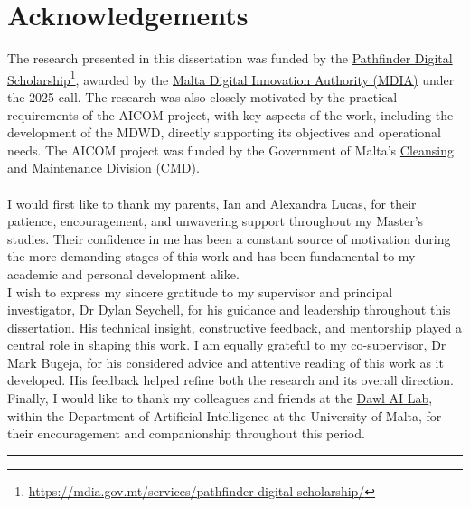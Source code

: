 \chapter*{Acknowledgements}

The research presented in this dissertation was funded by the \href{https://mdia.gov.mt/services/pathfinder-digital-scholarship/}
{Pathfinder Digital Scholarship}\footnote{\url{https://mdia.gov.mt/services/pathfinder-digital-scholarship/}}, awarded by the \href{https://mdia.gov.mt/}{Malta Digital Innovation Authority (MDIA)} under the 2025 call. The research was also closely motivated by the practical requirements of the \gls{AICOM} project, with key aspects of the work, including the development of the \gls{MDWD}, directly supporting its objectives and operational needs. The \gls{AICOM} project was funded by the Government of Malta's \href{https://publiccleanliness.gov.mt/public-bodies/cmd/}{Cleansing and Maintenance Division (CMD)}.\\\\

\noindent I would first like to thank my parents, Ian and Alexandra Lucas, for their patience, encouragement, and unwavering support throughout my Master's studies. Their confidence in me has been a constant source of motivation during the more demanding stages of this work and has been fundamental to my academic and personal development alike.\\

\noindent I wish to express my sincere gratitude to my supervisor and principal investigator, Dr Dylan Seychell, for his guidance and leadership throughout this dissertation. His technical insight, constructive feedback, and mentorship played a central role in shaping this work. I am equally grateful to my co-supervisor, Dr Mark Bugeja, for his considered advice and attentive reading of this work as it developed. His feedback helped refine both the research and its overall direction.\\

\noindent Finally, I would like to thank my colleagues and friends at the \href{https://www.um.edu.mt/research/dawl/}{Dawl AI Lab}, within the Department of Artificial Intelligence at the University of Malta, for their encouragement and companionship throughout this period.

\noindent\rule{\linewidth}{0.3pt}